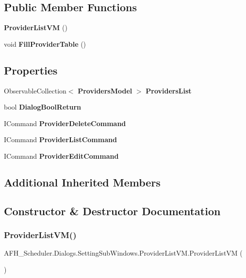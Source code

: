 \subsection*{Public Member Functions}
\begin{DoxyCompactItemize}
\item 
\textbf{ Provider\+List\+VM} ()
\item 
void \textbf{ Fill\+Provider\+Table} ()
\end{DoxyCompactItemize}
\subsection*{Properties}
\begin{DoxyCompactItemize}
\item 
Observable\+Collection$<$ \textbf{ Providers\+Model} $>$ \textbf{ Providers\+List}\hspace{0.3cm}{\ttfamily  [get, set]}
\item 
bool \textbf{ Dialog\+Bool\+Return}\hspace{0.3cm}{\ttfamily  [get, set]}
\item 
I\+Command \textbf{ Provider\+Delete\+Command}\hspace{0.3cm}{\ttfamily  [get]}
\item 
I\+Command \textbf{ Provider\+List\+Command}\hspace{0.3cm}{\ttfamily  [get]}
\item 
I\+Command \textbf{ Provider\+Edit\+Command}\hspace{0.3cm}{\ttfamily  [get]}
\end{DoxyCompactItemize}
\subsection*{Additional Inherited Members}


\subsection{Constructor \& Destructor Documentation}
\mbox{\label{class_a_f_h___scheduler_1_1_dialogs_1_1_setting_sub_windows_1_1_provider_list_v_m_aea3569ab0c0d7f2f26f75db733442a8f}} 
\subsubsection{ProviderListVM()}
{\footnotesize\ttfamily A\+F\+H\+\_\+\+Scheduler.\+Dialogs.\+Setting\+Sub\+Windows.\+Provider\+List\+V\+M.\+Provider\+List\+VM (\begin{DoxyParamCaption}{ }\end{DoxyParamCaption})}



